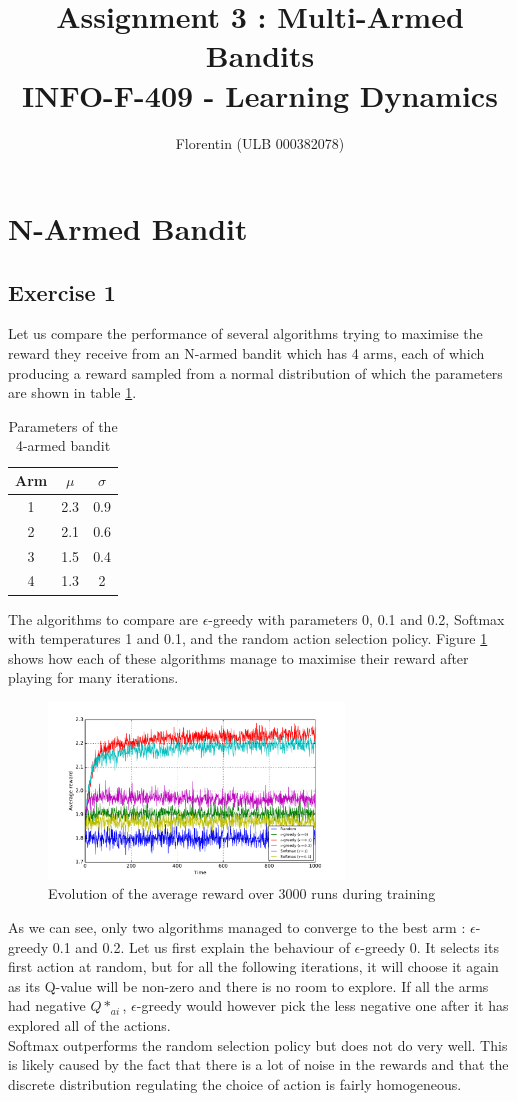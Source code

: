 \documentclass[a4paper]{article}
\title{
    Assignment 3 : Multi-Armed Bandits\\
    \small INFO-F-409 - Learning Dynamics
}
\author{Florentin \bsc{Hennecker} (ULB 000382078)}
\date{}
\begin{document}
\maketitle

\section{N-Armed Bandit}
\subsection{Exercise 1}

Let us compare the performance of several algorithms trying to maximise the
reward they receive from an N-armed bandit which has 4 arms, each of which 
producing a reward sampled from a normal distribution of which the parameters
are shown in table \ref{banditparams}.

\begin{table}[H]
\centering
\begin{tabular}{c|c|c}
	\textbf{Arm} & $\mu$ & $\sigma$ \\
	\hline
	1 & 2.3 & 0.9\\
	2 & 2.1 & 0.6\\
	3 & 1.5 & 0.4\\
	4 & 1.3 & 2\\
\end{tabular}
\caption{Parameters of the 4-armed bandit}
\label{banditparams}
\end{table}

The algorithms to compare are $\epsilon$-greedy with parameters 0, 0.1 and 0.2,
Softmax with temperatures 1 and 0.1, and the random action selection policy.
Figure \ref{ex11perf} shows how each of these algorithms manage to maximise
their reward after playing for many iterations. 
\begin{figure}[H]
	\centering
	\includegraphics[width=0.7\textwidth]{./fig/ex1-1.pdf}
	\caption{Evolution of the average reward over 3000 runs during training}
	\label{ex11perf}
\end{figure}
As we can see, only two algorithms managed to converge to the best arm : 
$\epsilon$-greedy 0.1 and 0.2. Let us first explain the behaviour of 
$\epsilon$-greedy 0. It selects its first action at random, but for all the
following iterations, it will choose it again as its Q-value will be non-zero
and there is no room to explore. If all the arms had negative $Q*_{ai}$, 
$\epsilon$-greedy would however pick the less negative one after it has explored
all of the actions.\\

Softmax outperforms the random selection policy but does not do very well. 
This is likely caused by the fact that there is a lot of noise in the rewards
and that the discrete distribution regulating the choice of action is fairly
homogeneous. 
\end{document}
